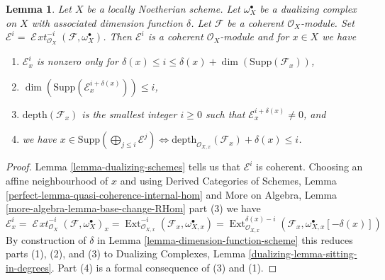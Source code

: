 \documentclass[10pt,a4paper]{amsart}
\theoremstyle{plain}
\newtheorem{lemma}[subsection]{Lemma}
\theoremstyle{definition}
\theoremstyle{remark}
\numberwithin{equation}{subsection}
\def\Ext{\mathop{\mathrm{Ext}}\nolimits}
\def\SheafExt{\mathop{\mathcal{E}\!\mathit{xt}}\nolimits}
\begin{document}
\begin{lemma}
\label{lemma-sitting-in-degrees}
Let $X$ be a locally Noetherian scheme. Let $\omega_X^\bullet$
be a dualizing complex on $X$ with associated dimension function $\delta$.
Let $\mathcal{F}$ be a coherent $\mathcal{O}_X$-module. Set
$\mathcal{E}^i = \SheafExt^{-i}_{\mathcal{O}_X}(\mathcal{F}, \omega_X^\bullet)$.
Then $\mathcal{E}^i$ is a coherent $\mathcal{O}_X$-module and
for $x \in X$ we have
\begin{enumerate}
\item $\mathcal{E}^i_x$ is nonzero only for
$\delta(x) \leq i \leq \delta(x) + \dim(\text{Supp}(\mathcal{F}_x))$,
\item $\dim(\text{Supp}(\mathcal{E}^{i + \delta(x)}_x)) \leq i$,
\item $\text{depth}(\mathcal{F}_x)$ is the smallest integer
$i \geq 0$ such that $\mathcal{E}_x^{i + \delta(x)} \not = 0$, and
\item we have
$x \in \text{Supp}(\bigoplus_{j \leq i} \mathcal{E}^j)
\Leftrightarrow
\text{depth}_{\mathcal{O}_{X, x}}(\mathcal{F}_x) + \delta(x) \leq i$.
\end{enumerate}
\end{lemma}

\begin{proof}
Lemma \ref{lemma-dualizing-schemes} tells us that $\mathcal{E}^i$
is coherent. Choosing an affine neighbourhood of $x$ and using
Derived Categories of Schemes, Lemma
\ref{perfect-lemma-quasi-coherence-internal-hom}
and
More on Algebra, Lemma
\ref{more-algebra-lemma-base-change-RHom} part (3)
we have
$$
\mathcal{E}^i_x =
\SheafExt^{-i}_{\mathcal{O}_X}(\mathcal{F}, \omega_X^\bullet)_x =
\Ext^{-i}_{\mathcal{O}_{X, x}}(\mathcal{F}_x,
\omega_{X, x}^\bullet) =
\Ext^{\delta(x) - i}_{\mathcal{O}_{X, x}}(\mathcal{F}_x,
\omega_{X, x}^\bullet[-\delta(x)])
$$
By construction of $\delta$ in Lemma \ref{lemma-dimension-function-scheme}
this reduces parts (1), (2), and (3) to
Dualizing Complexes, Lemma \ref{dualizing-lemma-sitting-in-degrees}.
Part (4) is a formal consequence of (3) and (1).
\end{proof}
\end{document}
